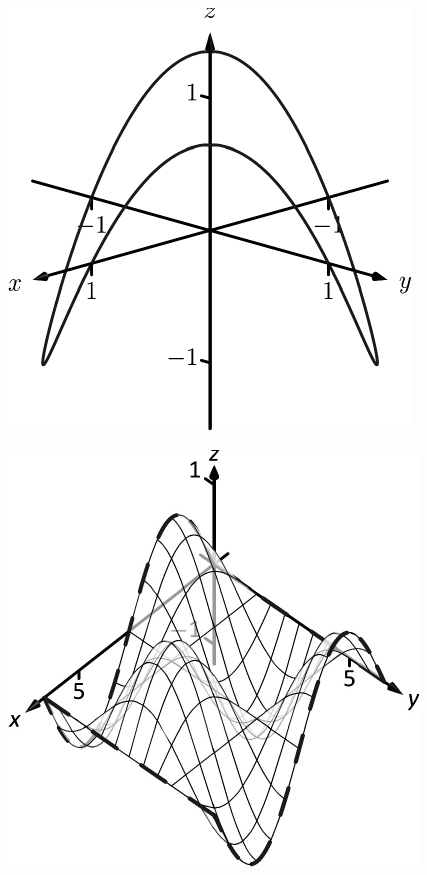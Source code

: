\documentclass[10pt]{article}
\begin{document}
\includegraphics{fig11_01_ex_14_3DBW.pdf}
\texttt{}

\includegraphics{fig13_05_ex_05_3DBW.pdf}
\texttt{}
\end{document}
